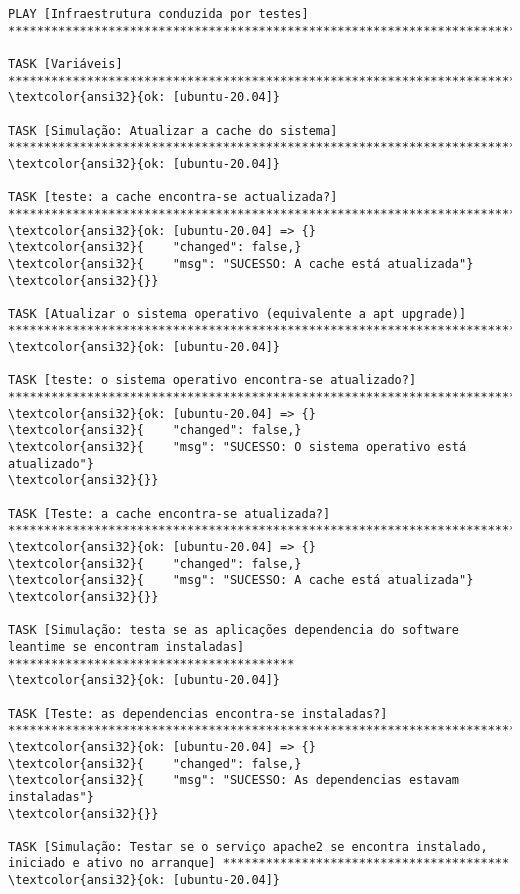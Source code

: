 \documentclass{scrartcl}
\begin{document}
\begin{Verbatim}
PLAY [Infraestrutura conduzida por testes] ***********************************************************************************************

TASK [Variáveis] *************************************************************************************************************************
\textcolor{ansi32}{ok: [ubuntu-20.04]}

TASK [Simulação: Atualizar a cache do sistema] *******************************************************************************************
\textcolor{ansi32}{ok: [ubuntu-20.04]}

TASK [teste: a cache encontra-se actualizada?] *******************************************************************************************
\textcolor{ansi32}{ok: [ubuntu-20.04] => {}
\textcolor{ansi32}{    "changed": false,}
\textcolor{ansi32}{    "msg": "SUCESSO: A cache está atualizada"}
\textcolor{ansi32}{}}

TASK [Atualizar o sistema operativo (equivalente a apt upgrade)] *************************************************************************
\textcolor{ansi32}{ok: [ubuntu-20.04]}

TASK [teste: o sistema operativo encontra-se atualizado?] ********************************************************************************
\textcolor{ansi32}{ok: [ubuntu-20.04] => {}
\textcolor{ansi32}{    "changed": false,}
\textcolor{ansi32}{    "msg": "SUCESSO: O sistema operativo está atualizado"}
\textcolor{ansi32}{}}

TASK [Teste: a cache encontra-se atualizada?] ********************************************************************************************
\textcolor{ansi32}{ok: [ubuntu-20.04] => {}
\textcolor{ansi32}{    "changed": false,}
\textcolor{ansi32}{    "msg": "SUCESSO: A cache está atualizada"}
\textcolor{ansi32}{}}

TASK [Simulação: testa se as aplicações dependencia do software leantime se encontram instaladas] ****************************************
\textcolor{ansi32}{ok: [ubuntu-20.04]}

TASK [Teste: as dependencias encontra-se instaladas?] ************************************************************************************
\textcolor{ansi32}{ok: [ubuntu-20.04] => {}
\textcolor{ansi32}{    "changed": false,}
\textcolor{ansi32}{    "msg": "SUCESSO: As dependencias estavam instaladas"}
\textcolor{ansi32}{}}

TASK [Simulação: Testar se o serviço apache2 se encontra instalado, iniciado e ativo no arranque] ****************************************
\textcolor{ansi32}{ok: [ubuntu-20.04]}


\end{Verbatim}
\end{document}

